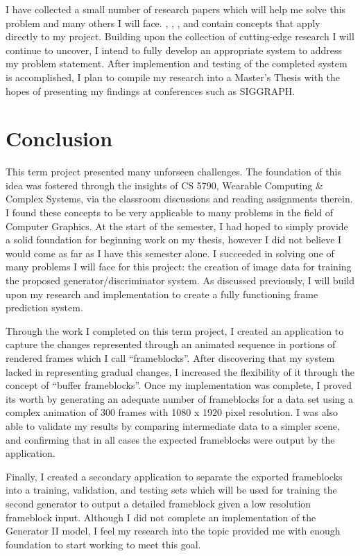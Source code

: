 \documentclass[conference]{IEEEtran}
\begin{document}
I have collected a small number of research papers which will help me solve this
problem and many others I will face.
\cite{ref:frame_prediction},
\cite{ref:spatiotemporal}, \cite{ref:posecnn}, and \cite{ref:pose_guided}
contain concepts that apply directly to my project.
Building upon the collection of cutting-edge research I will continue to uncover,
I intend to fully develop an appropriate system to address my problem statement.
After implemention and testing of the completed system is
accomplished, I plan to compile my research into a Master's Thesis with the
hopes of presenting my findings at conferences such as SIGGRAPH.

\section{Conclusion}
\label{sec:conclusion}
This term project presented many unforseen challenges. The foundation of this
idea was fostered
through the insights of CS 5790, Wearable Computing \& Complex Systems, via the
classroom discussions and reading assignments therein. I found these concepts to
be very applicable to many problems in the field
of Computer Graphics. At the start of the semester, I had hoped to simply provide a solid foundation
for beginning work on my thesis, however I did not believe I would come as far
as I have this semester alone. I succeeded in solving one of many problems I
will face for this project: the creation of image data for training the
proposed generator/discriminator system. As discussed previously, I will build upon my
research and implementation to create a fully functioning frame prediction system.

Through the work I completed on this term project,
I created an application to capture the changes
represented through an animated sequence in portions of rendered frames which I call
``frameblocks''. After discovering that my system lacked in representing gradual
changes, I increased the flexibility of it through the concept of ``buffer
frameblocks''. Once my implementation was complete,
I proved its worth by generating an adequate number of frameblocks for a
data set using a complex animation of 300 frames with 1080 x 1920 pixel
resolution.
I was also able to validate my results
by comparing intermediate data to a simpler scene, and confirming that in all cases
the expected frameblocks were output by the application.

Finally, I created a secondary application to separate the exported frameblocks
into a training, validation, and testing sets which will be used for training
the second generator to output a detailed frameblock given a low resolution
frameblock input.
Although I did not complete an implementation of the Generator II model,
I feel my research into the topic provided
me with enough foundation to start working to meet this goal.
\end{document}

